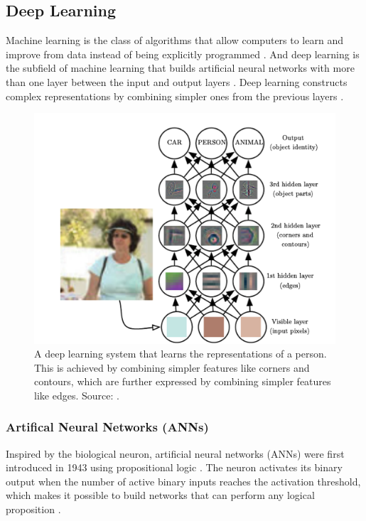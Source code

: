 \documentclass[a4paper, 11pt, oneside]{article}
\begin{document}
\subsection{Deep Learning}

Machine learning is the class of algorithms that allow computers to learn and improve from data instead of being
explicitly programmed \cite{samuel1959some, geron2019hands}. And deep learning is the subfield of machine learning that
builds artificial neural networks with more than one layer between the input and output layers
\cite{geron2019hands, burkov2019hundred, zhang2018definition}. Deep learning constructs complex representations by
combining simpler ones from the previous layers \cite{goodfellow2016deep}.

\begin{figure}[ht]
  \begin{center}
    \includegraphics[width=.8\textwidth]{deep_learning.png}
  \end{center}
  \caption{A deep learning system that learns the representations of a person. This is achieved by combining simpler
  features like corners and contours, which are further expressed by combining simpler features like edges. Source:
  \cite{goodfellow2016deep}.}
\end{figure}

\subsubsection{Artifical Neural Networks (ANNs)}

Inspired by the biological neuron, artificial neural networks (ANNs) were first introduced in 1943 using propositional
logic \cite{mcculloch1943logical}. The neuron activates its binary output when the number of active binary inputs reaches
the activation threshold, which makes it possible to build networks that can perform any logical proposition
\cite{geron2019hands, mcculloch1943logical}.
\end{document}
